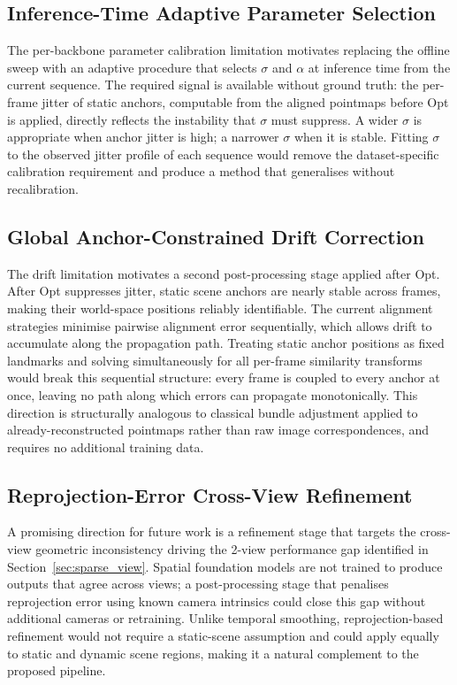 \subsection{Inference-Time Adaptive Parameter Selection}
The per-backbone parameter calibration limitation motivates replacing the offline sweep
with an adaptive procedure that selects $\sigma$ and $\alpha$ at inference time from
the current sequence. The required signal is available without ground truth: the
per-frame jitter of static anchors, computable from the aligned pointmaps before Opt
is applied, directly reflects the instability that $\sigma$ must suppress. A wider
$\sigma$ is appropriate when anchor jitter is high; a narrower $\sigma$ when it is
stable. Fitting $\sigma$ to the observed jitter profile of each sequence would remove
the dataset-specific calibration requirement and produce a method that generalises
without recalibration.

\subsection{Global Anchor-Constrained Drift Correction}
The drift limitation motivates a second post-processing stage applied after Opt.
After Opt suppresses jitter, static scene anchors are nearly stable across frames,
making their world-space positions reliably identifiable. The current alignment
strategies minimise pairwise alignment error sequentially, which allows drift to
accumulate along the propagation path. Treating static anchor positions as fixed
landmarks and solving simultaneously for all per-frame similarity transforms would
break this sequential structure: every frame is coupled to every anchor at once,
leaving no path along which errors can propagate monotonically. This direction is
structurally analogous to classical bundle adjustment applied to already-reconstructed
pointmaps rather than raw image correspondences, and requires no additional training
data.

\subsection{Reprojection-Error Cross-View Refinement}
A promising direction for future work is a refinement stage that targets the
cross-view geometric inconsistency driving the 2-view performance gap identified
in Section~\ref{sec:sparse_view}. Spatial foundation models are not trained to
produce outputs that agree across views; a post-processing stage that penalises
reprojection error using known camera intrinsics could close this gap without
additional cameras or retraining. Unlike temporal smoothing, reprojection-based
refinement would not require a static-scene assumption and could apply equally
to static and dynamic scene regions, making it a natural complement to the
proposed pipeline.

